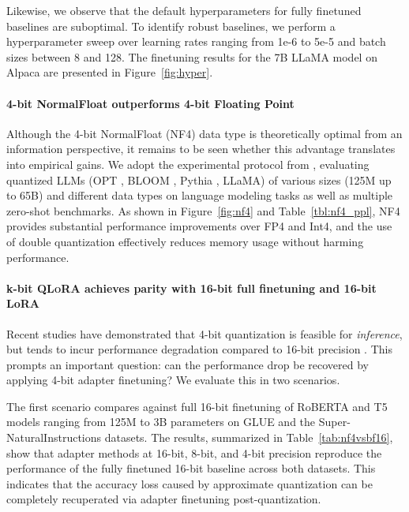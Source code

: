 Likewise, we observe that the default hyperparameters for fully finetuned baselines are suboptimal. To identify robust baselines, we perform a hyperparameter sweep over learning rates ranging from 1e-6 to 5e-5 and batch sizes between 8 and 128. The finetuning results for the 7B LLaMA model on Alpaca are presented in Figure~\ref{fig:hyper}.

\paragraph{4-bit NormalFloat outperforms 4-bit Floating Point} 

Although the 4-bit NormalFloat (NF4) data type is theoretically optimal from an information perspective, it remains to be seen whether this advantage translates into empirical gains. We adopt the experimental protocol from \citet{dettmers2022case}, evaluating quantized LLMs (OPT \citep{zhang2022opt}, BLOOM \cite{scao2022bloom}, Pythia \cite{biderman2023pythia}, LLaMA) of various sizes (125M up to 65B) and different data types on language modeling tasks as well as multiple zero-shot benchmarks. As shown in Figure~\ref{fig:nf4} and Table~\ref{tbl:nf4_ppl}, NF4 provides substantial performance improvements over FP4 and Int4, and the use of double quantization effectively reduces memory usage without harming performance.

\paragraph{k-bit \textsc{QLoRA} achieves parity with 16-bit full finetuning and 16-bit LoRA} Recent studies have demonstrated that 4-bit quantization is feasible for \emph{inference}, but tends to incur performance degradation compared to 16-bit precision \citep{dettmers2022case,frantar2022gptq}. This prompts an important question: can the performance drop be recovered by applying 4-bit adapter finetuning? We evaluate this in two scenarios.

The first scenario compares against full 16-bit finetuning of RoBERTA and T5 models ranging from 125M to 3B parameters on GLUE and the Super-NaturalInstructions datasets. The results, summarized in Table~\ref{tab:nf4vsbf16}, show that adapter methods at 16-bit, 8-bit, and 4-bit precision reproduce the performance of the fully finetuned 16-bit baseline across both datasets. This indicates that the accuracy loss caused by approximate quantization can be completely recuperated via adapter finetuning post-quantization.

